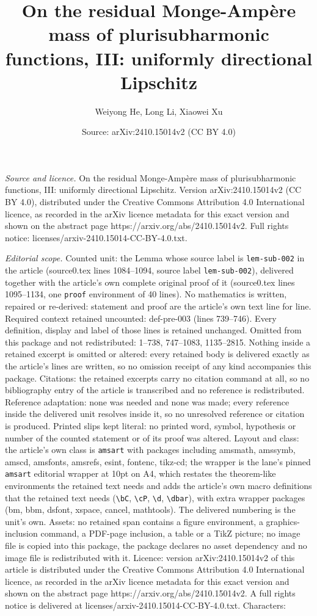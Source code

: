 \documentclass[10pt,a4paper]{amsart}
\title[On the residual Monge-Amp\`{e}re mass of plurisubharmonic fu]{On the residual Monge-Amp\`{e}re mass of plurisubharmonic functions, III: uniformly directional Lipschitz}
\author{Weiyong He, Long Li, Xiaowei Xu}
\date{Source: arXiv:2410.15014v2 (CC BY 4.0)}
\begin{document}
\maketitle

\noindent\emph{Source and licence.} On the residual Monge-Amp\`{e}re mass of plurisubharmonic functions, III: uniformly directional Lipschitz. Version arXiv:2410.15014v2 (CC BY 4.0), distributed under the Creative Commons Attribution 4.0 International licence, as recorded in the arXiv licence metadata for this exact version and shown on the abstract page https://arxiv.org/abs/2410.15014v2. Full rights notice: licenses/arxiv-2410.15014-CC-BY-4.0.txt.\par\smallskip

\noindent\textit{Editorial scope.} Counted unit: the Lemma whose source label is \texttt{lem-sub-002} in the article (source0.tex lines 1084--1094, source label \texttt{lem-sub-002}), delivered together with the article's own complete original proof of it (source0.tex lines 1095--1134, one \texttt{proof} environment of 40 lines). No mathematics is written, repaired or re-derived: statement and proof are the article's own text line for line. Required context retained uncounted: def-pre-003 (lines 739--746). Every definition, display and label of those lines is retained unchanged. Omitted from this package and not redistributed: 1--738, 747--1083, 1135--2815. Nothing inside a retained excerpt is omitted or altered: every retained body is delivered exactly as the article's lines are written, so no omission receipt of any kind accompanies this package. Citations: the retained excerpts carry no citation command at all, so no bibliography entry of the article is transcribed and no reference is redistributed. Reference adaptation: none was needed and none was made; every reference inside the delivered unit resolves inside it, so no unresolved reference or citation is produced. Printed slips kept literal: no printed word, symbol, hypothesis or number of the counted statement or of its proof was altered. Layout and class: the article's own class is \texttt{amsart} with packages including amsmath, amssymb, amscd, amsfonts, amsrefs, esint, fontenc, tikz-cd; the wrapper is the lane's pinned \texttt{amsart} editorial wrapper at 10pt on A4, which restates the theorem-like environments the retained text needs and adds the article's own macro definitions that the retained text needs (\texttt{\textbackslash bC}, \texttt{\textbackslash cP}, \texttt{\textbackslash d}, \texttt{\textbackslash dbar}), with extra wrapper packages (bm, bbm, dsfont, xspace, cancel, mathtools). The delivered numbering is the unit's own. Assets: no retained span contains a figure environment, a graphics-inclusion command, a PDF-page inclusion, a table or a TikZ picture; no image file is copied into this package, the package declares no asset dependency and no image file is redistributed with it. Licence: version arXiv:2410.15014v2 of this article is distributed under the Creative Commons Attribution 4.0 International licence, as recorded in the arXiv licence metadata for this exact version and shown on the abstract page https://arxiv.org/abs/2410.15014v2. A full rights notice is delivered at licenses/arxiv-2410.15014-CC-BY-4.0.txt. Characters: 
\end{document}
